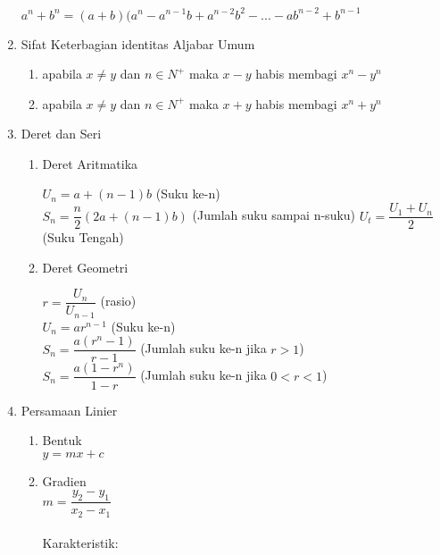 \documentclass[12pt,a4paper,draft,final,oneside,twoside,openright,openany]{article}
\begin{document}
\begin{enumerate}
\begin{center}
				$a^n+b^n=(a+b)(a^n-a^{n-1}b+a^{n-2}b^{2}-...-ab^{n-2}+b^{n-1}$
			\end{center}
			\item Sifat Keterbagian identitas Aljabar Umum
			\begin{enumerate}
				\item apabila $x\neq y$ dan $n\in N^+$ maka $x-y$ habis membagi $x^n-y^n$
				\item apabila $x\neq y$ dan $n\in N^+$ maka $x+y$ habis membagi $x^n+y^n$
			\end{enumerate}
			\item Deret dan Seri
			\begin{enumerate}
				\item Deret Aritmatika
					\begin{center}
						$U_n=a+(n-1)b$ (Suku ke-n)\\
						$S_n=\dfrac{n}{2}(2a+(n-1)b)$ (Jumlah suku sampai n-suku)
						$U_t=\dfrac{U_1+U_n}{2}$ (Suku Tengah)
					\end{center}
				\item Deret Geometri
					\begin{center}
						$r=\dfrac{U_{n}}{U_{n-1}}$ (rasio)\\
						$U_n=ar^{n-1}$ (Suku ke-n)\\
						$S_n=\dfrac{a(r^n-1)}{r-1}$ (Jumlah suku ke-n jika $r>1$)\\
						$S_n=\dfrac{a(1-r^n)}{1-r}$ (Jumlah suku ke-n jika $0<r<1$)
					\end{center}
			\end{enumerate}
			\item Persamaan Linier
				\begin{enumerate}
					\item Bentuk\\
					$y=mx+c$
					\item Gradien\\
					$m=\dfrac{y_2-y_1}{x_2-x_1}$\\
					\\
					Karakteristik:
			

\end{enumerate}
\end{enumerate}
\end{document}
